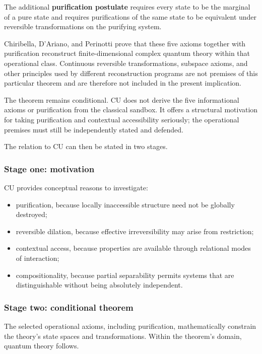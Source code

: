\documentclass[
  11pt,
]{article}
\providecommand{\tightlist}{%
  \setlength{\itemsep}{0pt}\setlength{\parskip}{0pt}}
\begin{document}
The additional \textbf{purification postulate} requires every state to
be the marginal of a pure state and requires purifications of the same
state to be equivalent under reversible transformations on the purifying
system.

Chiribella, D'Ariano, and Perinotti prove that these five axioms
together with purification reconstruct finite-dimensional complex
quantum theory within that operational class. Continuous reversible
transformations, subspace axioms, and other principles used by different
reconstruction programs are not premises of this particular theorem and
are therefore not included in the present implication.

The theorem remains conditional. CU does not derive the five
informational axioms or purification from the classical sandbox. It
offers a structural motivation for taking purification and contextual
accessibility seriously; the operational premises must still be
independently stated and defended.

The relation to CU can then be stated in two stages.

\subsubsection{Stage one: motivation}\label{stage-one-motivation}

CU provides conceptual reasons to investigate:

\begin{itemize}
\tightlist
\item
  purification, because locally inaccessible structure need not be
  globally destroyed;
\item
  reversible dilation, because effective irreversibility may arise from
  restriction;
\item
  contextual access, because properties are available through relational
  modes of interaction;
\item
  compositionality, because partial separability permits systems that
  are distinguishable without being absolutely independent.
\end{itemize}

\subsubsection{Stage two: conditional
theorem}\label{stage-two-conditional-theorem}

The selected operational axioms, including purification, mathematically
constrain the theory's state spaces and transformations. Within the
theorem's domain, quantum theory follows.
\end{document}
